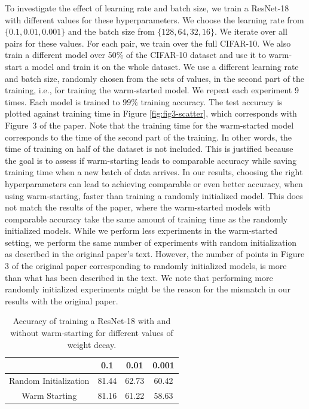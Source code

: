 To investigate the effect of learning rate and batch size, we train a ResNet-18 with different values for these hyperparameters. We choose the learning rate from $\{0.1, 0.01, 0.001\}$ and the batch size from $\{128, 64, 32, 16\}$. We iterate over all pairs for these values. For each pair, we train over the full CIFAR-10. We also train a different model over 50\% of the CIFAR-10 dataset and use it to warm-start a model and train it on the whole dataset. We use a different learning rate and batch size, randomly chosen from the sets of values, in the second part of the training, i.e., for training the warm-started model. We repeat each experiment 9 times. Each model is trained to $99\%$ training accuracy. The test accuracy is plotted against training time in Figure \ref{fig:fig3-scatter}, which corresponds with Figure~3 of the paper. Note that the training time for the warm-started model corresponds to the time of the second part of the training. In other words, the time of training on half of the dataset is not included. This is justified because the goal is to assess if warm-starting leads to comparable accuracy while saving training time when a new batch of data arrives. In our results, choosing the right hyperparameters can lead to achieving comparable or even better accuracy, when using warm-starting, faster than training a randomly initialized model. This does not match the results of the paper, where the warm-started models with comparable accuracy take the same amount of training time as the randomly initialized models. While we perform less experiments in the warm-started setting, we perform the same number of experiments with random initialization as described in the original paper's text. However, the number of points in Figure 3 of the original paper corresponding to randomly initialized models, is more than what has been described in the text. We note that performing more randomly initialized experiments might be the reason for the mismatch in our results with the original paper.


%
\begin{table}
    \renewcommand{\arraystretch}{1.2}
    \centering
    \begin{tabular}{c|c|c|c}
%
         & 0.1 & 0.01 & 0.001 \\ \hline
         Random Initialization & 81.44 & 62.73 & 60.42 \\
         Warm Starting & 81.16 & 61.22 & 58.63 \\ 
%
    \end{tabular}
    \vspace{10pt}
    \caption{Accuracy of training a ResNet-18 with and without warm-starting for different values of weight decay. }
    \label{tab:regularization}
\end{table}


